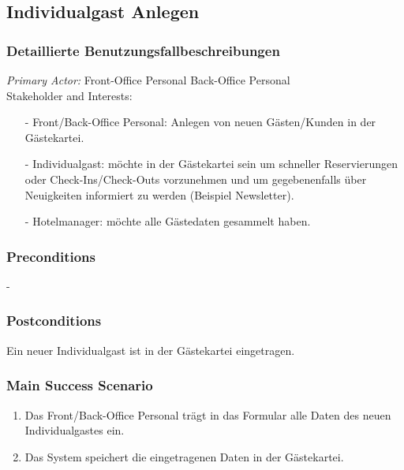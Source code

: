 \documentclass[./detailed_overview_usecases.tex]{subfiles}
\begin{document}
    \subsection{Individualgast Anlegen}
    \subsubsection{Detaillierte Benutzungsfallbeschreibungen}
    \textit{Primary Actor:}
    Front-Office Personal
	Back-Office Personal
    \\
    Stakeholder and Interests:
    \begin{itemize}
        \item[-] Front/Back-Office Personal: Anlegen von neuen Gästen/Kunden in der Gästekartei.
        \item[-] Individualgast: möchte in der Gästekartei sein um schneller Reservierungen oder Check-Ins/Check-Outs vorzunehmen
        und um gegebenenfalls über Neuigkeiten informiert zu werden (Beispiel Newsletter).
        \item[-] Hotelmanager: möchte alle Gästedaten gesammelt haben.
    \end{itemize}

    \subsubsection*{Preconditions}
    -

    \subsubsection*{Postconditions}
    Ein neuer Individualgast ist in der Gästekartei eingetragen.

    \subsubsection*{Main Success Scenario}
    \begin{enumerate}
        \item Das Front/Back-Office Personal trägt in das Formular alle Daten des neuen Individualgastes ein.
        \item Das System speichert die eingetragenen Daten in der Gästekartei.
    \end{enumerate}
\end{document}
